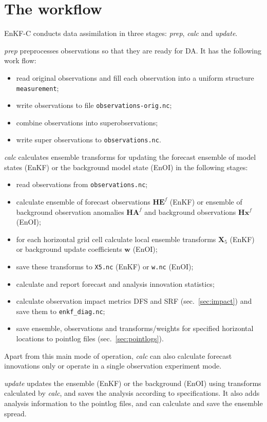 \documentclass[11pt]{report}
\newcommand{\mb} {\mathbf}
\begin{document}
\section{The workflow}

EnKF-C conducts data assimilation in three stages: \emph{prep}, \emph{calc} and \emph{update}.

\emph{prep} preprocesses observations so that they are ready for DA.
It has the following work flow:
\begin{itemize}
\item read original observations and fill each observation into a uniform structure \verb|measurement|;
\item write observations to file \verb|observations-orig.nc|;
\item combine observations into superobservations;
\item write super observations to \verb|observations.nc|.
\end{itemize}

\emph{calc} calculates ensemble transforms for updating the forecast ensemble of model states (EnKF) or the background model state (EnOI) in the following stages:
\begin{itemize}
\item read observations from \verb|observations.nc|;
\item calculate ensemble of forecast observations $\mb H \mb E^f$ (EnKF) or ensemble of background observation anomalies $\mb H \mb A^f$ and background observations $\mb H \mb x^f$ (EnOI);
\item for each horizontal grid cell calculate local ensemble transforms $\mb X_5$ (EnKF) or background update coefficients $\mb w$ (EnOI);
\item save these transforms to \verb|X5.nc| (EnKF) or \verb|w.nc| (EnOI);
\item calculate and report forecast and analysis innovation statistics;
\item calculate observation impact metrics DFS and SRF (sec.~\ref{sec:impact}) and save them to \verb|enkf_diag.nc|;
\item save ensemble, observations and transforms/weights for specified horizontal locations to pointlog files (sec.~\ref{sec:pointlogs}).
\end{itemize}
Apart from this main mode of operation, \emph{calc} can also calculate forecast  innovations only or operate in a single observation experiment mode.

\emph{update} updates the ensemble (EnKF) or the background (EnOI) using transforms calculated by \emph{calc}, and saves the analysis according to specifications.
It also adds analysis information to the pointlog files, and can calculate and save the ensemble spread.
\end{document}
